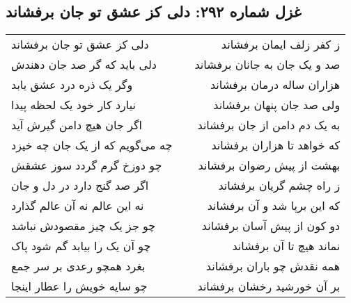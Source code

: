 \begin{center}
\section*{غزل شماره ۲۹۲: دلی کز عشق تو جان برفشاند}
\label{sec:292}
\begin{longtable}{l p{0.5cm} r}
دلی کز عشق تو جان برفشاند
&&
ز کفر زلف ایمان برفشاند
\\
دلی باید که گر صد جان دهندش
&&
صد و یک جان به جانان برفشاند
\\
وگر یک ذره درد عشق یابد
&&
هزاران ساله درمان برفشاند
\\
نیارد کار خود یک لحظه پیدا
&&
ولی صد جان پنهان برفشاند
\\
اگر جان هیچ دامن گیرش آید
&&
به یک دم دامن از جان برفشاند
\\
چه می‌گویم که از یک جان چه خیزد
&&
که خواهد تا هزاران برفشاند
\\
چو دوزخ گرم گردد سوز عشقش
&&
بهشت از پیش رضوان برفشاند
\\
اگر صد گنج دارد در دل و جان
&&
ز راه چشم گریان برفشاند
\\
نه این عالم نه آن عالم گذارد
&&
که این برپا شد و آن برفشاند
\\
چو جز یک چیز مقصودش نباشد
&&
دو کون از پیش آسان برفشاند
\\
چو آن یک را بیابد گم شود پاک
&&
نماند هیچ تا آن برفشاند
\\
بغرد همچو رعدی بر سر جمع
&&
همه نقدش چو باران برفشاند
\\
چو سایه خویش را عطار اینجا
&&
بر آن خورشید رخشان برفشاند
\\
\end{longtable}
\end{center}
